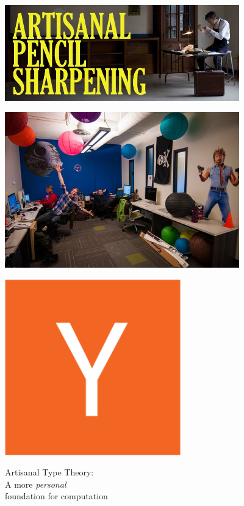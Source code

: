\documentclass{beamer}
\begin{document}
\begin{frame}
\centering
\includegraphics[width=4in]{pencil.jpg}
\end{frame}

\begin{frame}
\centering
\includegraphics[width=4in]{startup.jpg}
\end{frame}

\begin{frame}
\centering
\includegraphics[width=3in]{ycomb.png}
\end{frame}

\begin{frame}
\centering
{\LARGE Artisanal Type Theory: \\ A more \emph{personal} \\
foundation for computation}
\end{frame}
\end{document}
